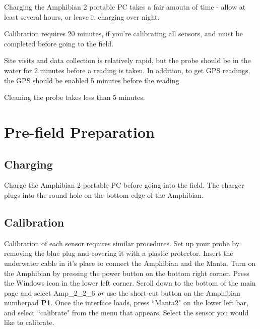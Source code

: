 \documentclass[12pt]{../SOP3_beta}\usepackage[]{graphicx}\usepackage[]{color}
\begin{document}
\NP Charging the Amphibian 2 portable PC takes a fair amoutn of time - allow at least several hours, or leave it charging over night. 

\NP Calibration requires 20 minutes, if you're calibrating all sensors, and must be completed before going to the field.

\NP Site visits and data collection is relatively rapid, but the probe should be in the water for 2 minutes before a reading is taken. In addition, to get GPS readings, the GPS should be enabled 5 minutes before the reading.

\NP Cleaning the probe takes less than 5 minutes.

\section{Pre-field Preparation}

\subsection{Charging}

\NP Charge the Amphibian 2 portable PC before going into the field. The charger plugs into the round hole on the bottom edge of the Amphibian. 

\subsection{Calibration}

\NP Calibration of each sensor requires similar procedures. Set up your probe by removing the blue plug and covering it with a plastic protector. Insert the underwater cable in it's place to connect the Amphibian and the Manta. Turn on the Amphibian by pressing the power button on the bottom right corner. Press the Windows icon in the lower left corner. Scroll down to the bottom of the main page and select Amp\_2\_2\_6 \emph{or} use the short-cut button on the Amphibian numberpad \textbf{P1}. Once the interface loads, press ``Manta2" on the lower left bar, and select ``calibrate" from the menu that appears. Select the sensor you would like to calibrate. 
\end{document}
